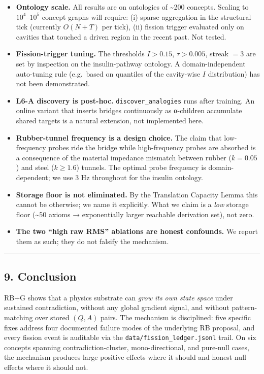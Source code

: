\documentclass[
  11pt,
  a4paper,
]{article}
\providecommand{\tightlist}{%
  \setlength{\itemsep}{0pt}\setlength{\parskip}{0pt}}
\begin{document}
\begin{itemize}
\tightlist
\item
  \textbf{Ontology scale.} All results are on ontologies of
  \textasciitilde200 concepts. Scaling to \(10^4\)--\(10^5\) concept
  graphs will require: (i) sparse aggregation in the structural tick
  (currently \(O(N + T)\) per tick), (ii) fission trigger evaluated only
  on cavities that touched a driven region in the recent past. Not
  tested.
\item
  \textbf{Fission-trigger tuning.} The thresholds \(I > 0.15\),
  \(\tau > 0.005\), streak \(= 3\) are set by inspection on the
  insulin-pathway ontology. A domain-independent auto-tuning rule
  (e.g.~based on quantiles of the cavity-wise \(I\) distribution) has
  not been demonstrated.
\item
  \textbf{L6-A discovery is post-hoc.} \texttt{discover\_analogies} runs
  after training. An online variant that inserts bridges continuously as
  α-children accumulate shared targets is a natural extension, not
  implemented here.
\item
  \textbf{Rubber-tunnel frequency is a design choice.} The claim that
  low-frequency probes ride the bridge while high-frequency probes are
  absorbed is a consequence of the material impedance mismatch between
  rubber (\(k=0.05\)) and steel (\(k \geq 1.6\)) tunnels. The optimal
  probe frequency is domain-dependent; we use 3 Hz throughout for the
  insulin ontology.
\item
  \textbf{Storage floor is not eliminated.} By the Translation Capacity
  Lemma this cannot be otherwise; we name it explicitly. What we claim
  is a \emph{low} storage floor (\textasciitilde50 axioms →
  exponentially larger reachable derivation set), not zero.
\item
  \textbf{The two ``high raw RMS'' ablations are honest confounds.} We
  report them as such; they do not falsify the mechanism.
\end{itemize}

\begin{center}\rule{0.5\linewidth}{0.5pt}\end{center}

\subsection{9. Conclusion}\label{conclusion}

RB+G shows that a physics substrate can \emph{grow its own state space}
under sustained contradiction, without any global gradient signal, and
without pattern-matching over stored \((Q, A)\) pairs. The mechanism is
disciplined: five specific fixes address four documented failure modes
of the underlying RB proposal, and every fission event is auditable via
the \texttt{data/fission\_ledger.jsonl} trail. On six concepts spanning
contradiction-cluster, mono-directional, and pure-null cases, the
mechanism produces large positive effects where it should and honest
null effects where it should not.
\end{document}
